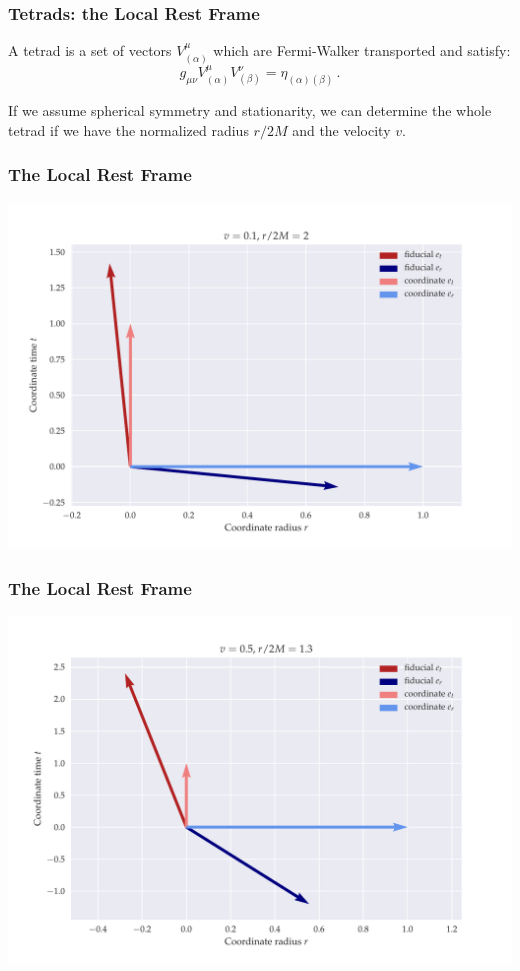 \documentclass{beamer}
\begin{document}
\begin{frame}
    \frametitle{Tetrads: the Local Rest Frame}

    A tetrad is a set of vectors \(V^\mu _{(\alpha)}\) which are Fermi-Walker transported and satisfy:
    \begin{equation*}
        g_{\mu\nu} V^\mu _{(\alpha)} V^\nu _{(\beta)} = \eta_{(\alpha) (\beta)}\,.
    \end{equation*}

    If we assume spherical symmetry and stationarity, we can determine the whole tetrad if we have the normalized radius \(r/2M\) and the velocity \(v\).
\end{frame}

\begin{frame}
    \frametitle{The Local Rest Frame}
        \includegraphics[width=\textwidth]{figures/low_speed}
\end{frame}

\begin{frame}
    \frametitle{The Local Rest Frame}
        \includegraphics[width=\textwidth]{figures/high_speed}
\end{frame}
\end{document}
